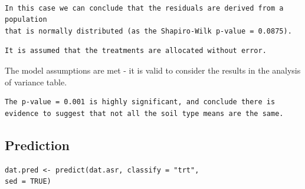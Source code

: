 \documentclass[a4paper, 10pt, fleqn, twosided]{memoir}
\begin{document}
\begin{tcolorbox}[title = Example 4 Shapiro-Wilk normality test interpretation]
\begin{verbatim}

In this case we can conclude that the residuals are derived from a population
that is normally distributed (as the Shapiro-Wilk p-value = 0.0875).

\end{verbatim}
\end{tcolorbox}



\begin{tcolorbox}[title = Example 4 Assumption 5]
\begin{verbatim}
It is assumed that the treatments are allocated without error.
\end{verbatim}
\end{tcolorbox}

The model assumptions are met - it is valid to consider the results in the analysis of variance table.

\begin{tcolorbox}[title = Example 4 ANOVA interpretation]
\begin{verbatim}
The p-value = 0.001 is highly significant, and conclude there is
evidence to suggest that not all the soil type means are the same.
\end{verbatim}
\end{tcolorbox}
\subsection{Prediction}

\begin{tcolorbox}[title = Example 4 predicted values]
\begin{verbatim}
dat.pred <- predict(dat.asr, classify = "trt",
sed = TRUE)
\end{verbatim}
\end{tcolorbox}
\end{document}
